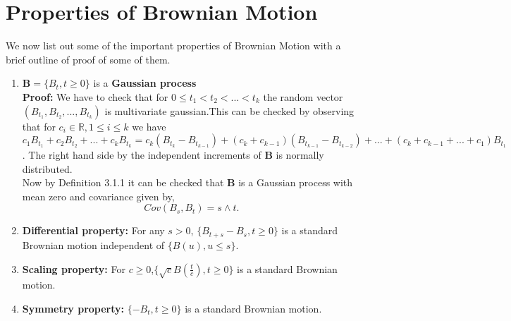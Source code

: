 \documentclass[12pt]{report}
\begin{document}
\section{Properties of Brownian Motion}
We now list out some of the important properties of Brownian Motion with a brief outline of proof of some of them.
\begin{enumerate}
    \item $\mathbf{B} = \{B_t ,t \geq 0\}$ is a \textbf{Gaussian process}\\
    \textbf{Proof:} We have to check that for $0\leq t_1<t_2<...<t_k$ the random vector $(B_{t_{1}},B_{t_{2}},...,B_{t_{k}})$ is multivariate gaussian.This can be checked by observing that for $c_i \in \mathbb{R}, 1 \leq i \leq k $ we have $c_{1}B_{t_{1}} + c_{2}B_{t_{2}}+...+c_{k}B_{t_{k}} = c_{k}(B_{t_{k}} - B_{t_{k-1}} ) + (c_{k}+c_{k-1})(B_{t_{k-1}}-B_{t_{k-2}})+...+(c_{k}+c_{k-1}+...+c_{1})B_{t_{1}}  $. The right hand side by the independent increments of $\mathbf{B}$ is normally distributed.\\ Now by Definition 3.1.1 it can be checked that $\mathbf{B}$ is a Gaussian process with mean zero and covariance given by,\\
    $$ Cov(B_s , B_t)  = s \wedge t.$$
    
    \item \textbf{Differential property:} For any $s > 0$, $\{B_{t+s} - B_{s},t \geq 0\}$ is a standard Brownian motion independent of $\{B(u),u\leq s\}$.
    
    \item \textbf{Scaling property:} For $c \geq 0$,$\{\sqrt{c}B(\frac{t}{c}), t \geq 0\}$ is a standard Brownian motion.
    
    \item \textbf{Symmetry property:} $\{-B_{t} ,t \geq 0\}$ is a standard Brownian motion.
    

\end{enumerate}
\end{document}
